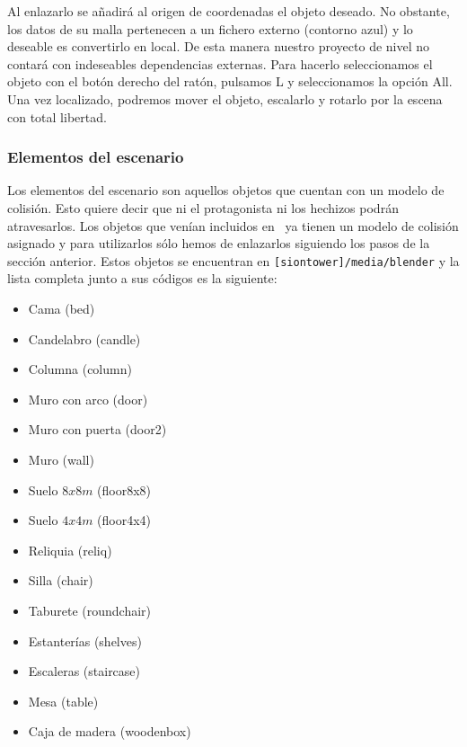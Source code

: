 
Al enlazarlo se añadirá al origen de coordenadas el objeto deseado. No obstante,
los datos de su malla pertenecen a un fichero externo (contorno azul) y lo
deseable es convertirlo en local. De esta manera nuestro proyecto de nivel
no contará con indeseables dependencias externas. Para hacerlo
seleccionamos el objeto con el botón derecho del ratón, pulsamos L y
seleccionamos la opción All. Una vez localizado, podremos mover el objeto,
escalarlo y rotarlo por la escena con total libertad.


\subsubsection*{Elementos del escenario}

Los elementos del escenario son aquellos objetos que cuentan con un modelo
de colisión. Esto quiere decir que ni el protagonista ni los hechizos podrán
atravesarlos. Los objetos que venían incluidos en \juego\ ya tienen un modelo
de colisión asignado y para utilizarlos sólo hemos de enlazarlos siguiendo
los pasos de la sección anterior. Estos objetos se encuentran en
\texttt{[siontower]/media/blender} y la lista completa junto a sus códigos
es la siguiente:

\begin{itemize}
    \itemsep0em
    \item Cama (bed)
    \item Candelabro (candle)
    \item Columna (column)
    \item Muro con arco (door)
    \item Muro con puerta (door2)
    \item Muro (wall)
    \item Suelo $8x8 m$ (floor8x8)
    \item Suelo $4x4 m$ (floor4x4)
    \item Reliquia (reliq)
    \item Silla (chair)
    \item Taburete (roundchair)
    \item Estanterías (shelves)
    \item Escaleras (staircase)
    \item Mesa (table)
    \item Caja de madera (woodenbox)
\end{itemize}


